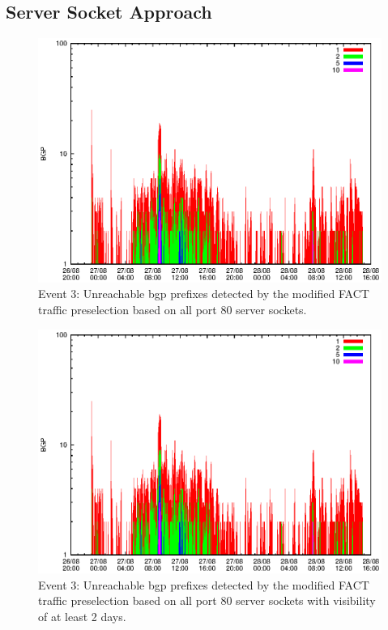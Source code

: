 \subsection{Server Socket Approach} 
\begin{figure}
	[p] \centering 
	\includegraphics[width=0.75\linewidth]{images/events/2010_08_27/bgp_log_allPort80SES.eps} \caption{Event 3: Unreachable \gls{bgp} prefixes detected by the modified \gls{FACT} traffic preselection based on all port 80 \glspl{server socket}.} 
	\label{fig:RIPE_FACT_allSES80} 
\end{figure}
\begin{figure}
	[p] \centering 
	\includegraphics[width=0.75\linewidth]{images/events/2010_08_27/bgp_log_port80_Set_stab_0_vts_2.eps} \caption{Event 3: Unreachable \gls{bgp} prefixes detected by the modified \gls{FACT} traffic preselection based on all port 80 \glspl{server socket} with visibility of at least 2 days.} 
	\label{fig:RIPE_FACT_allSES80VTS2} 
\end{figure}
